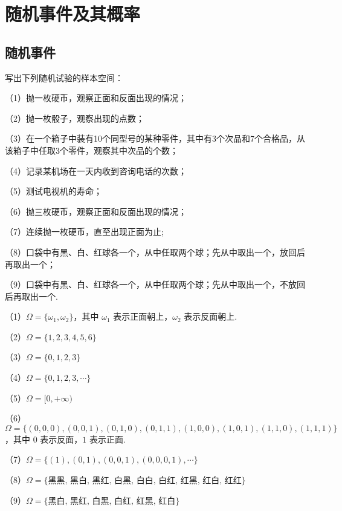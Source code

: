 
\chapter{随机事件及其概率}
\thispagestyle{plain}

\section{随机事件}

\question 写出下列随机试验的样本空间：

（1）抛一枚硬币，观察正面和反面出现的情况；

（2）抛一枚骰子，观察出现的点数；

（3）在一个箱子中装有10个同型号的某种零件，其中有3个次品和7个合格品，从该箱子中任取3个零件，观察其中次品的个数；

（4）记录某机场在一天内收到咨询电话的次数；

（5）测试电视机的寿命；

（6）抛三枚硬币，观察正面和反面出现的情况；

（7）连续抛一枚硬币，直至出现正面为止;

（8）口袋中有黑、白、红球各一个，从中任取两个球；先从中取出一个，放回后再取出一个；

（9）口袋中有黑、白、红球各一个，从中任取两个球；先从中取出一个，不放回后再取出一个.

\begin{solution}
    （1）$\varOmega = \{ \omega_1, \omega_2 \}$，其中 $\omega_1$ 表示正面朝上，$\omega_2$ 表示反面朝上.

    （2）$\varOmega = \{ 1,2,3,4,5,6 \}$

    （3）$\varOmega = \{ 0,1,2,3 \}$

    （4）$\varOmega = \{ 0,1,2,3,\cdots \}$

    （5）$\varOmega = [0, +\infty)$

    （6）$\varOmega = \{ (0,0,0), (0,0,1), (0,1,0), (0,1,1), (1,0,0), (1,0,1), (1,1,0), (1,1,1) \}$，其中 $0$ 表示反面，$1$ 表示正面.

    （7）$\varOmega = \{ (1), (0,1), (0,0,1), (0,0,0,1), \cdots \}$

    （8）$\varOmega = \{ \text{黑黑, 黑白, 黑红, 白黑, 白白, 白红, 红黑, 红白, 红红} \}$

    （9）$\varOmega = \{ \text{黑白, 黑红, 白黑, 白红, 红黑, 红白} \}$
\end{solution}



